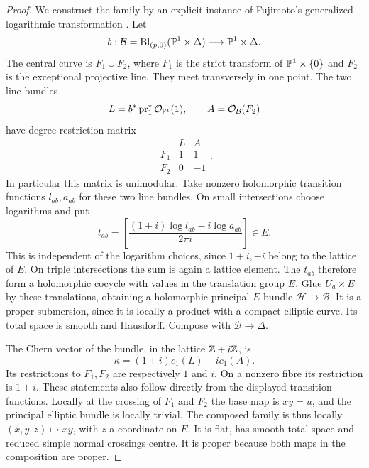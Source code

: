 \begin{proof}
We construct the family by an explicit instance of Fujimoto's
generalized logarithmic transformation
\citep[Definition 1.1, pp.~85--86]{Fujimoto1990AB}.
Let
\[
 b:\mathcal B=\operatorname{Bl}_{(p,0)}(\mathbb P^1\times\Delta)
       \longrightarrow\mathbb P^1\times\Delta.
\]
The central curve is $F_1\cup F_2$, where $F_1$ is the strict
transform of $\mathbb P^1\times\{0\}$ and $F_2$ is the exceptional
projective line.  They meet transversely in one point.  The two
line bundles
\[
 L=b^*\operatorname{pr}_1^*\mathcal O_{\mathbb P^1}(1),
 \qquad A=\mathcal O_{\mathcal B}(F_2)
\]
have degree-restriction matrix
\[
 \begin{array}{c|rr}
       &L&A\\\hline
 F_1&1&1\\
 F_2&0&-1
 \end{array}.
\]
In particular this matrix is unimodular.  Take nonzero holomorphic
transition functions $l_{ab},a_{ab}$ for these two line bundles.
On small intersections choose logarithms and put
\[
 t_{ab}=\left[
       \frac{(1+i)\log l_{ab}-i\log a_{ab}}{2\pi i}
                         \right]\in E.
\]
This is independent of the logarithm choices, since $1+i,-i$
belong to the lattice of $E$.  On triple intersections the sum
is again a lattice element.  The $t_{ab}$ therefore form a
holomorphic cocycle with values in the translation group $E$.
Glue $U_a\times E$ by these translations, obtaining a
holomorphic principal $E$-bundle $\mathcal H\to\mathcal B$.
It is a proper submersion, since it is locally a product with a
compact elliptic curve.  Its total space is smooth and Hausdorff.
Compose with $\mathcal B\to\Delta$.

The Chern vector of the bundle, in the lattice $\mathbb Z+i\mathbb Z$, is
\[
 \kappa=(1+i)c_1(L)-i c_1(A).
\]
Its restrictions to $F_1,F_2$ are respectively $1$ and $i$.
On a nonzero fibre its restriction is $1+i$.  These statements
also follow directly from the displayed transition functions.
Locally at the crossing of $F_1$ and $F_2$ the base map is
$xy=u$, and the principal elliptic bundle is locally trivial.
The composed family is thus locally $(x,y,z)\mapsto xy$,
with $z$ a coordinate on $E$.  It is flat, has smooth total
space and reduced simple normal crossings centre.  It is proper
because both maps in the composition are proper.


\end{proof}
